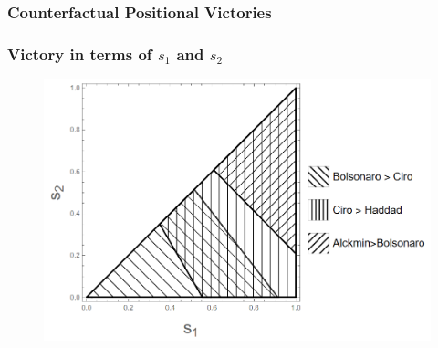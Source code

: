 \documentclass{beamer}
\begin{document}
\begin{frame}
  \frametitle{Counterfactual Positional Victories }

\end{frame}

\begin{frame}
  \frametitle{Victory in terms of \(s_1\) and \(s_2\)}
\begin{figure}[!h] \centering \includegraphics[width=\columnwidth]{../images/counterfactual_triangle.png}
\end{figure}


\end{frame}
\end{document}
